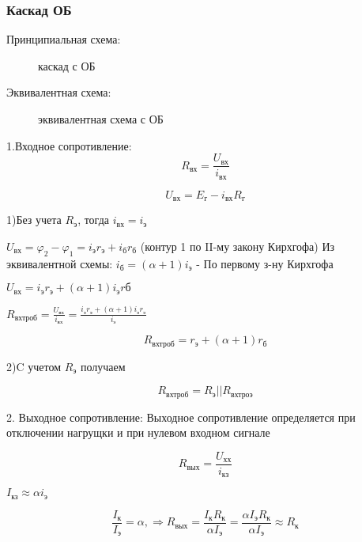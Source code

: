 \subsubsection{Каскад ОБ}

Принципиальная схема:
\begin{center}
	\begin{figure}[h!]
		\caption{каскад с ОБ}
	\end{figure}
\end{center}
Эквивалентная схема:
\begin{center}
	\begin{figure}[h!]
		\caption{эквивалентная схема с ОБ}
	\end{figure}
\end{center}

1.Входное сопротивление:
$$R_\textit{вх}=\frac{U_\textit{вх}}{i_\textit{вх}}$$

$$U_\textit{вх}=E_\textit{г}-i_\textit{вх}R_\textit{г}$$

1)Без учета $R_\textit{э}$, тогда $i_\textit{вх}=i_\textit{э}$

$U_\textit{вх}=\varphi_2-\varphi_1=i_\textit{э}r_\textit{э}+i_\textit{б}r_\textit{б}$
(контур 1 по II-му закону Кирхгофа)
Из эквивалентной схемы:
$i_\textit{б}=(\alpha+1)i_\textit{э}$ - По первому з-ну Кирхгофа

$U_\textit{вх}=i_\textit{э}r_\textit{э}+(\alpha+1)i_\textit{э}r\textit{б}$

$R_\textit{вхтроб}=\frac{U_\textit{вх}}{i_\textit{вх}}=\frac{i_\textit{э}r_\textit{э}+(\alpha+1)i_\textit{э}r_\textit{э}}{i_\textit{э}}$

$$
R_\textit{вхтроб}=r_\textit{э} + (\alpha+1)r_\textit{б}
$$

2)C учетом $R_\textit{э}$ получаем

$$
R_\textit{вхтроб}=R_\textit{э}||R_\textit{вхтроэ}
$$

2. Выходное сопротивление:
 Выходное сопротивление определяется при отключении нагрущки и при нулевом входном сигнале
 
 $$R_\textit{вых}=\frac{U_\textit{хх}}{i_\textit{кз}}$$

$ I_\textit{кз}\approx \alpha i_\textit{э}$

$$
\frac{I_\textit{к}}{I_\textit{э}}=\alpha,\Rightarrow R_\textit{вых}=\frac{I_\textit{к}R_\textit{к}}{\alpha I_\textit{э}}=\frac{\alpha I_\textit{э}R_\textit{к}}{\alpha I_\textit{э}}\approx R_\textit{к}
$$

